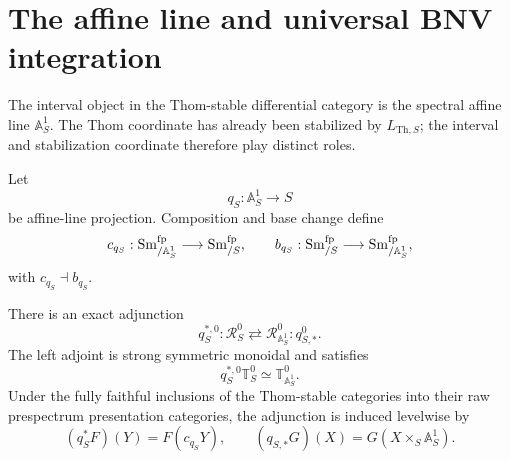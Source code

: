 \section{The affine line and universal BNV integration}
\label{sec:infinitesimal-bnv-integration}

The interval object in the Thom-stable differential category is the spectral
affine line \(\mathbb A^1_S\).  The Thom coordinate has already been stabilized
by \(L_{\mathrm{Th},S}\); the interval and stabilization coordinate therefore
play distinct roles.

Let
\[
  q_S:\mathbb A^1_S\longrightarrow S
\]
be affine-line projection.  Composition and base change define
\[
  c_{q_S}:\operatorname{Sm}^{\mathrm{fp}}_{/\mathbb A^1_S}
  \longrightarrow\operatorname{Sm}^{\mathrm{fp}}_{/S},
  \qquad
  b_{q_S}:\operatorname{Sm}^{\mathrm{fp}}_{/S}
  \longrightarrow\operatorname{Sm}^{\mathrm{fp}}_{/\mathbb A^1_S},
\]
with \(c_{q_S}\dashv b_{q_S}\).

\begin{proposition}
\label{prop:infinitesimal-raw-affine-line-adjunction}
There is an exact adjunction
\[
  q_S^{*,0}:
  \mathcal R_S^0
  \rightleftarrows
  \mathcal R_{\mathbb A^1_S}^0:
  q_{S,*}^{0}.
\]
The left adjoint is strong symmetric monoidal and satisfies
\[
  q_S^{*,0}\mathbb T_S^0
  \simeq
  \mathbb T_{\mathbb A^1_S}^0.
\]
Under the fully faithful inclusions of the Thom-stable categories into their
raw prespectrum presentation categories, the adjunction is induced levelwise by
\[
  (q_S^*F)(Y)=F(c_{q_S}Y),
  \qquad
  (q_{S,*}G)(X)=G(X\times_S\mathbb A^1_S).
\]
\end{proposition}


